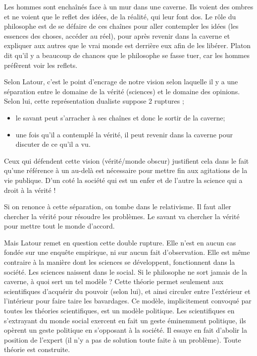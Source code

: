 Les hommes sont enchaînés face à un mur dans une caverne.
Ils voient des ombres et ne voient que le reflet des idées, de la réalité, qui leur font dos.
Le rôle du philosophe est de se défaire de ces chaînes pour aller contempler les idées (les essences des choses, accéder au réel), pour après revenir dans la caverne et expliquer aux autres que le vrai monde est derrière eux afin de les libérer.
Platon dit qu'il y a beaucoup de chances que le philosophe se fasse tuer, car les hommes préfèrent voir les reflets.

Selon Latour, c'est le point d'encrage de notre vision selon laquelle il y a une séparation entre le domaine de la vérité (sciences) et le domaine des opinions.
Selon lui, cette représentation dualiste suppose 2 ruptures ;
\begin{itemize}
	\item le savant peut s'arracher à ses chaînes et donc le sortir de la caverne;
	\item une fois qu'il a contemplé la vérité, il peut revenir dans la caverne pour discuter de ce qu'il a vu.
\end{itemize}
Ceux qui défendent cette vision (vérité/monde obscur) justifient cela dans le fait qu'une référence à un au-delà est nécessaire pour mettre fin aux agitations de la vie publique.
D'un coté la société qui est un enfer et de l'autre la science qui a droit à la vérité !

Si on renonce à cette séparation, on tombe dans le relativisme.
Il faut aller chercher la vérité pour résoudre les problèmes.
Le savant va chercher la vérité pour mettre tout le monde d'accord.

Mais Latour remet en question cette double rupture.
Elle n'est en aucun cas fondée sur une enquête empirique, ni sur aucun fait d'observation.
Elle est même contraire à la manière dont les sciences se développent, fonctionnent dans la société.
Les sciences naissent dans le social.
Si le philosophe ne sort jamais de la caverne, à quoi sert un tel modèle ? Cette théorie permet seulement aux scientifiques d'acquérir du pouvoir (selon lui), et ainsi circuler entre l'extérieur et l'intérieur pour faire taire les bavardages.
Ce modèle, implicitement convoqué par  toutes les théories scientifiques, est un modèle politique.
Les scientifiques en s'extrayant du monde social exercent en fait un geste éminemment politique, ils opèrent un geste politique en s'opposant à la société.
Il essaye en fait d'abolir la position de l'expert (il n'y a pas de solution toute faite à un problème).
Toute théorie est construite.

